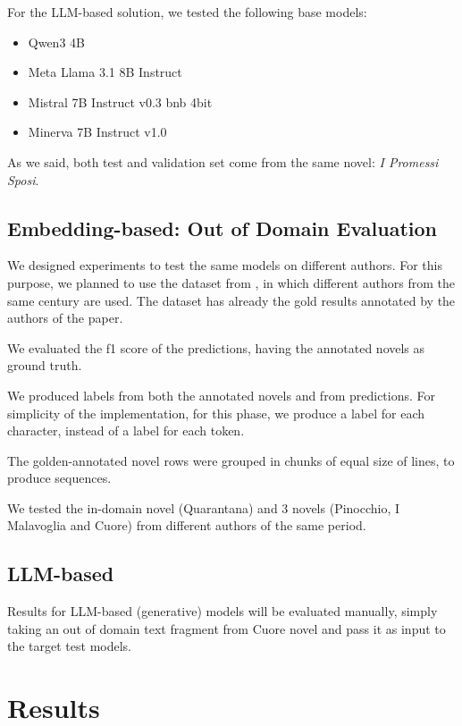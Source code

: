 \documentclass[11pt]{article}
\begin{document}
For the LLM-based solution, we tested the following base models:

 \begin{itemize}
 	\item Qwen3 4B
	\item Meta Llama 3.1 8B Instruct
	\item Mistral 7B Instruct v0.3 bnb 4bit
	\item Minerva 7B Instruct v1.0
\end{itemize}

As we said, both test and validation set come from the same novel: \emph{I Promessi Sposi}. 

\subsection{Embedding-based: Out of Domain Evaluation}

We designed experiments to test the same models on different authors.
For this purpose, we planned to use the dataset from \cite{redaelli-sprugnoli-2024-sentence}, in which different authors
from the same century are used.
The dataset has already the gold results annotated by the authors of the paper.

We evaluated the f1 score of the predictions, having the annotated
novels as ground truth.

We produced labels from both the annotated novels and 
from predictions. For simplicity of the implementation,
for this phase, we produce a label for each character, instead of a label for each token.

The golden-annotated novel rows were grouped in chunks of equal size of lines, to produce sequences.

We tested the in-domain novel (Quarantana) and 3 novels (Pinocchio, I Malavoglia and Cuore) from different authors of the same period.

\subsection{LLM-based}

Results for LLM-based (generative)  models will be evaluated manually, simply taking an out of domain 
text fragment from Cuore novel and pass it as input to the target test models.

\section{Results}
\end{document}
